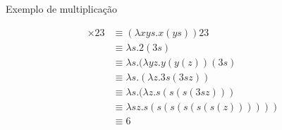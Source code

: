 \begin{frame}[fragile]{Exemplo de multiplicação}

    \begin{align*}
        \times 23 &\equiv (\lambda xys.x(ys))23 \\
        &\equiv \lambda s.2(3s) \\
        &\equiv \lambda s.(\lambda yz.y(y(z))(3s) \\
        &\equiv \lambda s.(\lambda z.3s(3sz)) \\
        &\equiv \lambda s.(\lambda z.s(s(s(3sz))) \\
        &\equiv \lambda sz.s(s(s(s(s(s(z)))))) \\
        &\equiv 6
    \end{align*}

\end{frame}
